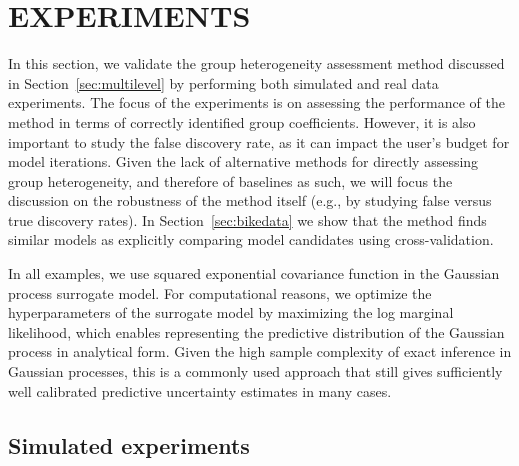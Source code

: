\documentclass{article}
\begin{document}
%
%
%
%
%

\section{EXPERIMENTS}
\label{sec:experiments}

In this section, we validate the group heterogeneity assessment method discussed in Section~\ref{sec:multilevel} by performing both simulated and real data experiments.
The focus of the experiments is on assessing the performance of the method in terms of correctly identified group coefficients.
However, it is also important to study the false discovery rate, as it can impact the user's budget for model iterations.
Given the lack of alternative methods for directly assessing group heterogeneity, and therefore of baselines as such, we will focus the discussion on the robustness of the method itself (e.g., by studying false versus true discovery rates). In Section~\ref{sec:bikedata} we show that the method finds similar models
as explicitly comparing model candidates using cross-validation.

In all examples, we use squared exponential covariance function in the Gaussian process surrogate model.
%
%
%
For computational reasons, we optimize the hyperparameters of the surrogate model by maximizing the log marginal likelihood, which enables representing the predictive distribution of the Gaussian process in analytical form.
%
Given the high sample complexity of exact inference in Gaussian processes, this is a commonly used approach that still gives sufficiently well calibrated predictive uncertainty estimates in many cases.


\subsection{Simulated experiments}
\label{sec:simulations}
\end{document}
